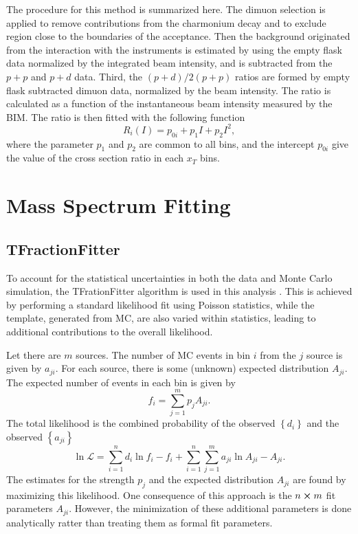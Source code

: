 \documentclass[../main.tex]{subfiles}
\begin{document}
The procedure for this method is summarized here. The dimuon selection is applied to remove contributions
from the charmonium decay and to exclude region close to the boundaries of the acceptance.
Then the background originated from the interaction with the instruments is estimated by using
the empty flask data normalized by the integrated beam intensity, and is subtracted from the
$p+p$ and $p+d$ data. Third, the $(p+d)/2(p+p)$ ratios are formed by empty flask subtracted
dimuon data, normalized by the beam intensity. The ratio is calculated as a function of the
instantaneous beam intensity measured by the BIM. The ratio is then fitted with the following function
\begin{equation}
	R_i \left(I\right) = p_{0i} + p_1 I + p_2 I^2,
\end{equation}
where the parameter $p_1$ and $p_2$ are common to all bins, and the intercept $p_{0i}$ give
the value of the cross section ratio in each $x_T$ bins.

\section{Mass Spectrum Fitting}

\subsection{TFractionFitter}
To account for the statistical uncertainties in both the data and Monte Carlo
simulation, the TFrationFitter algorithm is used in this analysis \cite{barlow1993}.
This is achieved by performing a standard likelihood fit using Poisson statistics,
while the template, generated from MC, are also varied within statistics, leading
to additional contributions to the overall likelihood.

Let there are $m$ sources. The number of MC events in bin $i$ from the $j$ source
is given by $a_{ji}$. For each source, there is some (unknown) expected distribution
$A_{ji}$. The expected number of events in each bin is given by
\begin{equation}
	f_i = \sum^m_{j=1} p_j A_{ji}.
	\label{eq:TF_f}
\end{equation}
The total likelihood is the combined probability of the observed $\left\{d_i\right\}$
and the observed $\left\{a_{ji}\right\}$
\begin{equation}
	\ln \mathcal{L} = \sum^n_{i=1} d_i \ln f_i -f_i + \sum^n_{i=1} \sum^m_{j=1} a_{ji} \ln A_{ji} - A_{ji}.
	\label{eq:TF_likelihood}
\end{equation}
The estimates for the strength $p_j$ and the expected distribution $A_{ji}$ are
found by maximizing this likelihood. One consequence of this approach is the
$n \cross m$ fit parameters $A_{ji}$. However, the  minimization of these additional
parameters is done analytically ratter than treating them as formal fit parameters.
\end{document}
